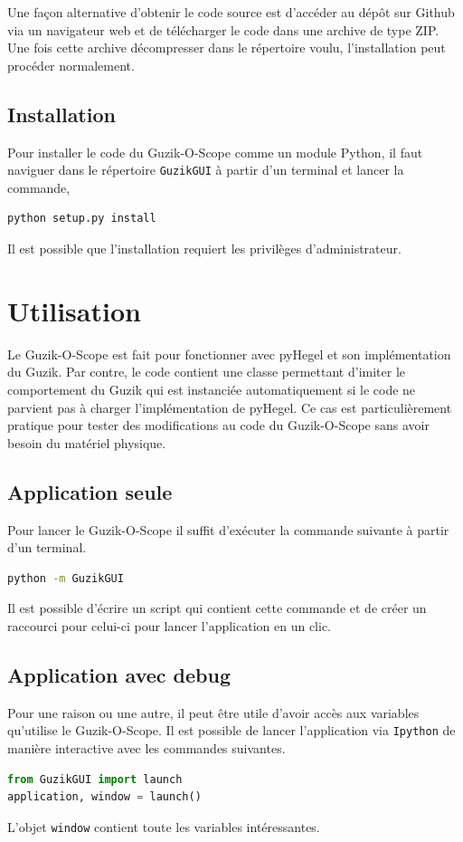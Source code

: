 \documentclass[openright,letterpaper,12pt]{book}
\begin{document}
Une façon alternative d'obtenir le code source est d'accéder au dépôt sur 
Github via un navigateur web et de télécharger le code dans une archive de 
type ZIP. 
Une fois cette archive décompresser dans le répertoire voulu, l'installation 
peut procéder normalement.

\section*{Installation}
Pour installer le code du Guzik-O-Scope comme un module Python, il faut 
naviguer dans le répertoire \verb+GuzikGUI+ à partir d'un terminal et lancer 
la commande,
\begin{lstlisting}[language=Bash]
python setup.py install
\end{lstlisting}
Il est possible que l'installation requiert les privilèges d'administrateur. 

\chapter*{Utilisation}
Le Guzik-O-Scope est fait pour fonctionner avec pyHegel et son implémentation 
du Guzik. 
Par contre, le code contient une classe permettant d'imiter le comportement du 
Guzik qui est instanciée automatiquement si le code ne parvient pas à 
charger l'implémentation de pyHegel. 
Ce cas est particulièrement pratique pour tester des modifications au code du 
Guzik-O-Scope sans avoir besoin du matériel physique.
\section*{Application seule}
Pour lancer le Guzik-O-Scope il suffit d'exécuter la commande suivante à partir 
d'un terminal.
\begin{lstlisting}[language=Bash]
python -m GuzikGUI
\end{lstlisting}
Il est possible d'écrire un script qui contient cette commande et de créer un 
raccourci pour celui-ci pour lancer l'application en un clic.

\section*{Application avec debug}
Pour une raison ou une autre, il peut être utile d'avoir accès aux variables 
qu'utilise le Guzik-O-Scope. 
Il est possible de lancer l'application via \verb+Ipython+ de manière 
interactive avec les commandes suivantes.
\begin{lstlisting}[language=Python]
from GuzikGUI import launch
application, window = launch()
\end{lstlisting}
L'objet \verb+window+ contient toute les variables intéressantes.
\clearpage\null\thispagestyle{empty}
\end{document}
